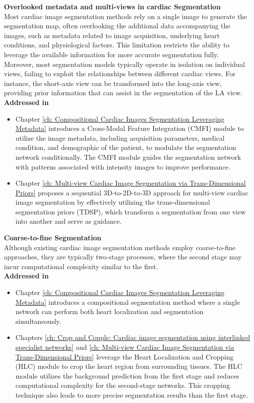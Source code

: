 \noindent\textbf{Overlooked metadata and multi-views in cardiac Segmentation}\\
Most cardiac image segmentation methods rely on a single image to generate the segmentation map, often overlooking the additional data accompanying the images, such as metadata related to image acquisition, underlying heart conditions, and physiological factors. This limitation restricts the ability to leverage the available information for more accurate segmentation fully. Moreover, most segmentation models typically operate in isolation on individual views, failing to exploit the relationships between different cardiac views. For instance, the short-axis view can be transformed into the long-axis view, providing prior information that can assist in the segmentation of the LA view.\\
\textbf{Addressed in}

\begin{itemize}
    \item Chapter \ref{ch: Compositional Cardiac Images Segmentation Leveraging Metadata} introduces a Cross-Modal Feature Integration (CMFI) module to utilize the image metadata, including acquisition parameters, medical condition, and demographic of the patient, to modulate the segmentation network conditionally. The CMFI module guides the segmentation network with patterns associated with intensity images to improve performance.
    \item Chapter \ref{ch: Multi-view Cardiac Image Segmentation via Trans-Dimensional Priors} proposes a sequential 3D-to-2D-to-3D approach for multi-view cardiac image segmentation by effectively utilizing the trans-dimensional segmentation priors (TDSP), which transform a segmentation from one view into another and serve as guidance.
\end{itemize}
\noindent\textbf{Coarse-to-fine Segmentation}\\
Although existing cardiac image segmentation methods employ coarse-to-fine approaches, they are typically two-stage processes, where the second stage may incur computational complexity similar to the first.\\
\textbf{Addressed in}

\begin{itemize}
    \item Chapter \ref{ch: Compositional Cardiac Images Segmentation Leveraging Metadata} introduces a compositional segmentation method where a single network can perform both heart localization and segmentation simultaneously.
    \item Chapters \ref{ch: Crop and Couple: Cardiac image segmentation using interlinked specialist networks} and \ref{ch: Multi-view Cardiac Image Segmentation via Trans-Dimensional Priors} leverage the Heart Localization and Cropping (HLC) module to crop the heart region from surrounding tissues. The HLC module utilizes the background prediction from the first stage and reduces computational complexity for the second-stage networks. This cropping technique also leads to more precise segmentation results than the first stage.
\end{itemize}

